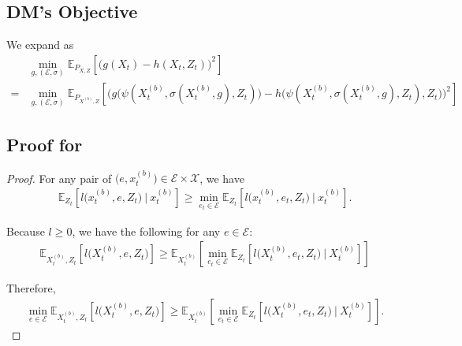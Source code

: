 \subsection{DM's Objective}\label{subapx:expanded-obj}
We expand  as
\begin{align*}
&\min_{g,(\mathcal{E},\sigma)}\mathbb{E}_{P_{X,Z}}\left[\big(g(X_t)-h(X_t,Z_t)\big)^2\right]
\\
=&\min_{g,(\mathcal{E},\sigma)}\mathbb{E}_{P_{X^{(b)},Z}}\left[\Big(g\big(\psi(X_t^{(b)},\sigma(X_t^{(b)},g),Z_t)\big)-h\big(\psi(X_t^{(b)},\sigma(X_t^{(b)},g),Z_t),Z_t\big)\Big)^2\right]
\end{align*}


\subsection{Proof for }
\begin{proof}
For any pair of $\big(e,x_t^{(b)}\big)\in\mathcal{E}\times\mathcal{X}$, we have
\begin{align}
\mathbb{E}_{Z_t}\left[l\big(x_t^{(b)},e,Z_t\big)\ \big\lvert\ x_t^{(b)}\right] 
\geq 
\min_{e_t\in\mathcal{E}} \mathbb{E}_{Z_t}\left[l\big(x_t^{(b)},e_t,Z_t\big)\ \big\lvert\ x_t^{(b)}\right]
.
\end{align}

Because $l\geq 0$, we have the following for any $e\in\mathcal{E}$:
\begin{align}
\mathbb{E}_{X_t^{(b)},Z_t}\left[l\big(X_t^{(b)},e,Z_t\big)\right] 
\geq 
\mathbb{E}_{X_t^{(b)}}\left[\min_{e_t\in\mathcal{E}} \mathbb{E}_{Z_t}\left[l\big(X_t^{(b)},e_t,Z_t\big)\ \big\lvert\ X_t^{(b)}\right]\right]
\end{align}

Therefore,
\begin{align}
\min_{e\in\mathcal{E}}\mathbb{E}_{X_t^{(b)},Z_t}\left[l\big(X_t^{(b)},e, Z_t\big)\right] 
\geq 
\mathbb{E}_{X_t^{(b)}}\left[\min_{e_t\in\mathcal{E}}\mathbb{E}_{Z_t}\left[l\big(X_t^{(b)},e_t, Z_t\big)\ \big\lvert\ X_t^{(b)}\right]\right].
\end{align}
\end{proof}


